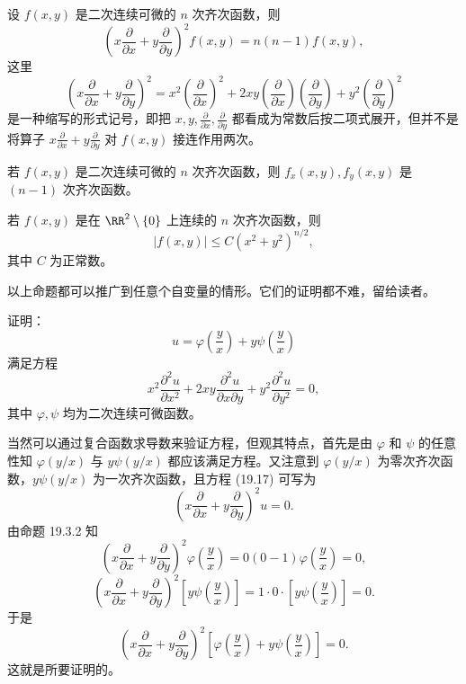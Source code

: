 \begin{xproposition}[19.3.2]
设 $f(x,y)$ 是二次连续可微的 $n$ 次齐次函数，则
\[
  \left(x\frac{\partial}{\partial x}+y\frac{\partial}{\partial y}\right)^2f(x,y)=n(n-1)f(x,y),
\]
这里
\[
  \left(x\frac{\partial}{\partial x}+y\frac{\partial}{\partial y}\right)^2
  =x^2\left(\frac{\partial}{\partial x}\right)^2
  +2xy\left(\frac{\partial}{\partial x}\right)\left(\frac{\partial}{\partial y}\right)
  +y^2\left(\frac{\partial}{\partial y}\right)^2
\]
是一种缩写的形式记号，即把 $x,y,\frac{\partial}{\partial x},\frac{\partial}{\partial y}$ 都看成为常数后按二项式展开，但并不是将算子 $x\frac{\partial}{\partial x}+y\frac{\partial}{\partial y}$ 对 $f(x,y)$ 接连作用两次。
\end{xproposition}

\begin{xproposition}[19.3.3]
若 $f(x,y)$ 是二次连续可微的 $n$ 次齐次函数，则 $f_x(x,y),f_y(x,y)$ 是 $(n-1)$ 次齐次函数。
\end{xproposition}

\begin{xproposition}[19.3.4]
若 $f(x,y)$ 是在 $\RR^2\setminus\{0\}$ 上连续的 $n$ 次齐次函数，则
\[
  |f(x,y)|\le C(x^2+y^2)^{n/2},
\]
其中 $C$ 为正常数。
\end{xproposition}

以上命题都可以推广到任意个自变量的情形。它们的证明都不难，留给读者。

\begin{xexample}[19.3.7]
证明：
\[
  u=\varphi\left(\frac yx\right)+y\psi\left(\frac yx\right)
\]
满足方程
\begin{equation}
  x^2\frac{\partial^2u}{\partial x^2}+2xy\frac{\partial^2u}{\partial x\partial y}+y^2\frac{\partial^2u}{\partial y^2}=0,
  \tag{19.17}
\end{equation}
其中 $\varphi,\psi$ 均为二次连续可微函数。
\end{xexample}
\begin{xsolution}
当然可以通过复合函数求导数来验证方程，但观其特点，首先是由 $\varphi$ 和 $\psi$ 的任意性知 $\varphi(y/x)$ 与 $y\psi(y/x)$ 都应该满足方程。又注意到 $\varphi(y/x)$ 为零次齐次函数，$y\psi(y/x)$ 为一次齐次函数，且方程 (19.17) 可写为
\[
  \left(x\frac{\partial}{\partial x}+y\frac{\partial}{\partial y}\right)^2u=0.
\]
由命题 19.3.2 知
\[
  \left(x\frac{\partial}{\partial x}+y\frac{\partial}{\partial y}\right)^2\varphi\left(\frac yx\right)
  =0(0-1)\varphi\left(\frac yx\right)=0,
\]
\[
  \left(x\frac{\partial}{\partial x}+y\frac{\partial}{\partial y}\right)^2\left[y\psi\left(\frac yx\right)\right]
  =1\cdot0\cdot\left[y\psi\left(\frac yx\right)\right]=0.
\]
于是
\[
  \left(x\frac{\partial}{\partial x}+y\frac{\partial}{\partial y}\right)^2
  \left[\varphi\left(\frac yx\right)+y\psi\left(\frac yx\right)\right]=0.
\]
这就是所要证明的。
\end{xsolution}

